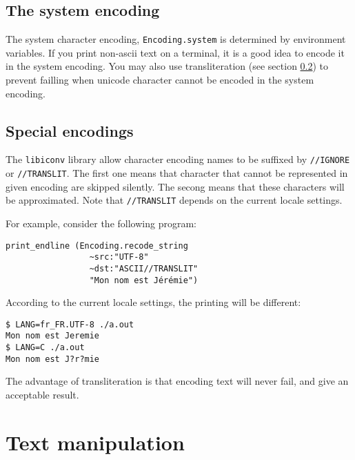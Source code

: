 \documentclass{article}
\begin{document}
\subsection{The system encoding}

The system character encoding, \texttt{Encoding.system} is determined
by environment variables. If you print non-ascii text on a terminal,
it is a good idea to encode it in the system encoding. You may also
use transliteration (see section \ref{special-encoding}) to prevent
failling when unicode character cannot be encoded in the system
encoding.

\subsection{Special encodings}
\label{special-encoding}

The \texttt{libiconv} library allow character encoding names to be
suffixed by \texttt{//IGNORE} or \texttt{//TRANSLIT}. The first one
means that character that cannot be represented in given encoding are
skipped silently. The secong means that these characters will be
approximated. Note that \texttt{//TRANSLIT} depends on the current
locale settings.

For example, consider the following program:

\begin{verbatim}
print_endline (Encoding.recode_string
                 ~src:"UTF-8"
                 ~dst:"ASCII//TRANSLIT"
                 "Mon nom est Jérémie")
\end{verbatim}

According to the current locale settings, the printing will be
different:

\begin{verbatim}
$ LANG=fr_FR.UTF-8 ./a.out
Mon nom est Jeremie
$ LANG=C ./a.out
Mon nom est J?r?mie
\end{verbatim}

The advantage of transliteration is that encoding text will never
fail, and give an acceptable result.

\section{Text manipulation}
\end{document}
